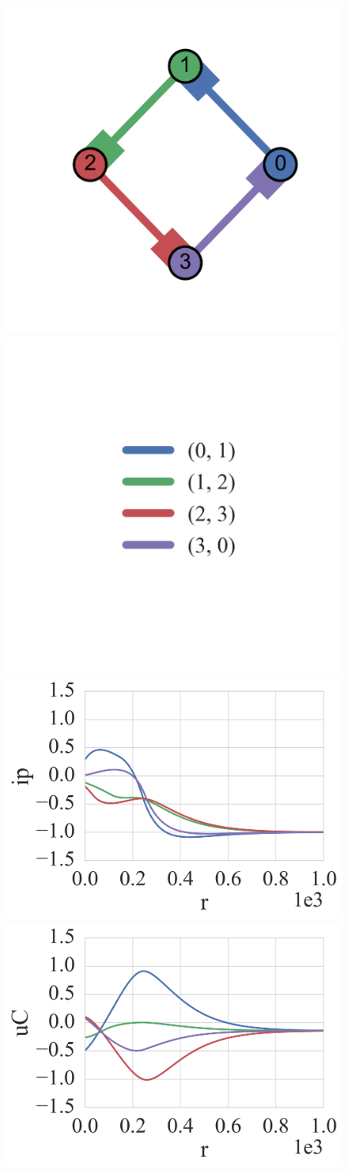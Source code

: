 \documentclass{standalone}
\begin{document}
  \begin{minipage}[t]{\textwidth}

  \begin{figure}
      \centering
      \includegraphics[width=0.4\linewidth,keepaspectratio,trim={0 3cm 0 2cm},clip]{./pics/cycle/cycle_4.png}
      \qquad
      \includegraphics[width=0.4\linewidth,keepaspectratio,trim={0 3cm 0 2cm},clip]{./pics/cycle/cycle_4_legend.png}
      \vfill
      \includegraphics[width=0.4\linewidth,keepaspectratio]{./pics/cycle/cycle_4_ip_negative.png}
      \qquad
      \includegraphics[width=0.4\linewidth,keepaspectratio]{./pics/cycle/cycle_4_uC_negative.png}
  \end{figure}

  \end{minipage}
\end{document}
